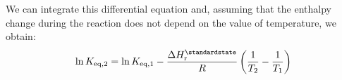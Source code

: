 \documentclass[12pt,a4paper]{report}
\begin{document}
   We can integrate this differential equation and, assuming that the enthalpy change during the reaction does not depend on the value of temperature, we obtain:
    \begin{equation*}
   \ln K_{\mathrm{eq,2}}=\ln K_{\mathrm{eq,1}}-\frac{\Delta H^{\standardstate}_{\mathrm{r}}}{R}\left(\frac{1}{T_{2}}-\frac{1}{T_{1}}\right)
   \end{equation*} 
\end{document}
